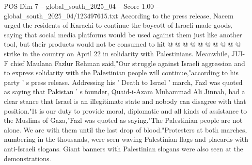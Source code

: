 \begin{textsample}{POS Dim 7 – global\_south\_2025\_04 – Score 1.00 – global\_south\_2025\_04/123497615.txt}
According to the press release, Naeem urged the residents of Karachi to continue the boycott of Israeli-made goods, saying that social media platforms would be used against them just like another tool, but their products would not be consumed to hit @ @ @ @ @ @ @ @ @ @ strike in the country on April 22 in solidarity with Palestinians.
Meanwhile, JUI-F chief Maulana Fazlur Rehman said,"Our struggle against Israeli aggression and to express solidarity with the Palestinian people will continue,"according to his party ' s press release.
Addressing his ' Death to Israel ' march, Fazl was quoted as saying that Pakistan ' s founder, Quaid-i-Azam Muhammad Ali Jinnah, had a clear stance that Israel is an illegitimate state and nobody can disagree with that position."It is our duty to provide moral, diplomatic and all kinds of assistance to the Muslims of Gaza,"Fazl was quoted as saying."The Palestinian people are not alone.
We are with them until the last drop of blood."Protesters at both marches, numbering in the thousands, were seen waving Palestinian flags and placards with anti-Israeli slogans.
Giant banners with Palestinian slogans were also seen at the demonstrations.

\end{textsample}

